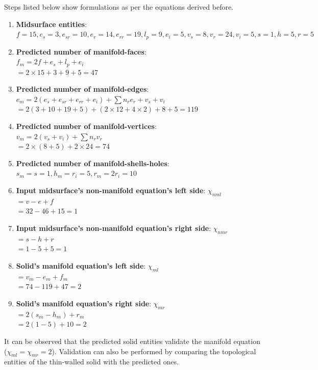 Steps listed below show formulations as per the equations derived before.


\begin{enumerate}
[noitemsep,topsep=2pt,parsep=2pt,partopsep=2pt,label=\textbullet]
\item \textbf{Midsurface entities}: \\$f = 15, e_s = 3, e_{sr} = 10, e_r = 14, e_{rr} = 19, l_p = 9 ,e_i=5,v_s = 8,v_r =24, v_i= 5, s=1,h=5,r=5$
\item \textbf{Predicted number of manifold-faces}: \\$f_m = 2f+e_s+ l_p +e_i $\\$= 2 \times 15 + 3 + 9 + 5 = 47$
\item \textbf{Predicted number of manifold-edges}: \\ $e_m = 2(e_s+e_{sr}+e_{rr}+e_i )+ \sum n_{r} e_{r}+v_s+v_i $\\$= 2(3+10+19 + 5)+ (2\times 12 + 4 \times 2)+8+5 = 119$
\item \textbf{Predicted number of manifold-vertices}: \\$v_m = 2(v_s+ v_i) + \sum n_{r} v_r$\\$=2\times (8 + 5)  + 2 \times 24=74$
\item \textbf{Predicted number of manifold-shells-holes}: \\$s_m =s = 1, h_m = r_i  = 5, r_m = 2r_i = 10$
\item \textbf{Input midsurface's non-manifold equation's left side}:  $\chi_{nml} $\\$= v-e+f $\\$= 32-46+15 = 1$
\item \textbf{Input midsurface's non-manifold equation's right side}:  $\chi_{nmr}$\\$=s-h+r$\\$=1-5+5 = 1$
\item \textbf{Solid's manifold equation's left side}:  $\chi_{ml} $\\$= v_m-e_m+f_m $\\$=74-119+47= 2$
\item \textbf{Solid's manifold equation's right side}:  $\chi_{mr}$\\$=2(s_m-h_m )+r_m$\\$= 2(1-5)+10 = 2$
\end{enumerate}
It can be observed that the predicted solid entities validate the manifold equation ($\chi_{ml} = \chi_{mr} = 2$). Validation can also be performed by comparing the  topological entities of the thin-walled solid with the predicted ones.
